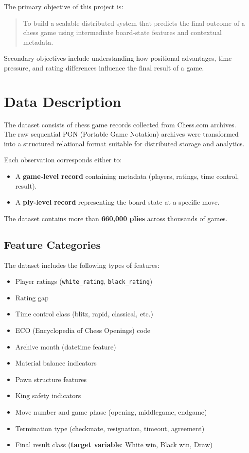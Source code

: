 \documentclass[12pt,a4paper]{article}
\begin{document}
The primary objective of this project is:

\begin{quote}
To build a scalable distributed system that predicts the final outcome of a chess game using intermediate board-state features and contextual metadata.
\end{quote}

Secondary objectives include understanding how positional advantages, time pressure, and rating differences influence the final result of a game.

\section{Data Description}

The dataset consists of chess game records collected from Chess.com archives. The raw sequential PGN (Portable Game Notation) archives were transformed into a structured relational format suitable for distributed storage and analytics.

Each observation corresponds either to:

\begin{itemize}
    \item A \textbf{game-level record} containing metadata (players, ratings, time control, result).
    \item A \textbf{ply-level record} representing the board state at a specific move.
\end{itemize}

The dataset contains more than \textbf{660,000 plies} across thousands of games.

\subsection{Feature Categories}

The dataset includes the following types of features:

\begin{itemize}
    \item Player ratings (\texttt{white\_rating}, \texttt{black\_rating})
    \item Rating gap
    \item Time control class (blitz, rapid, classical, etc.)
    \item ECO (Encyclopedia of Chess Openings) code
    \item Archive month (datetime feature)
    \item Material balance indicators
    \item Pawn structure features
    \item King safety indicators
    \item Move number and game phase (opening, middlegame, endgame)
    \item Termination type (checkmate, resignation, timeout, agreement)
    \item Final result class (\textbf{target variable}: White win, Black win, Draw)
\end{itemize}
\end{document}
